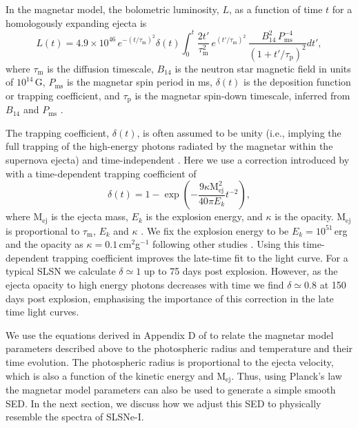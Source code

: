 In the magnetar model, the bolometric luminosity, $L$, as a function
of time $t$ for a homologously expanding ejecta is
\citep{1982ApJ...253..785A}
\begin{equation}
L(t) = 4.9\times 10^{46}\,e^{ -(t / \tau_\mathrm{m})^2 }\delta(t) \int_{0}^{t} \frac{2t'}{\tau_\mathrm{m}^2}\,e^{(t'/\tau_\mathrm{m})^2}\,\frac{B_{14}^{2}\,P_{\mathrm{ms}}^{-4}}{\left(1+t'/\tau_\mathrm{p}\right)^2} dt',
\label{Eq:MagnetarLum}
\end{equation}
where $\tau_\mathrm{m}$ is the diffusion timescale, $B_{14}$ is the
neutron star magnetic field in units of $10^{14}$\,G,
$P_{\mathrm{ms}}$ is the magnetar spin period in ms, $\delta(t)$ is
the deposition function or trapping coefficient, and $\tau_\mathrm{p}$
is the magnetar spin-down timescale, inferred from $B_{14}$ and
$P_{\mathrm{ms}}$ \cite[see Appendix D of ][and references therein for
full details]{2013ApJ...770..128I}.

The trapping coefficient, $\delta(t)$, is often assumed to be unity
(i.e., implying the full trapping of the high-energy photons radiated
by the magnetar within the supernova ejecta) and time-independent
\citep{2013ApJ...770..128I,2015MNRAS.449.1215P,2015MNRAS.452.3869N}.
Here we use a correction introduced by \cite{2015ApJ...799..107W} with
a time-dependent trapping coefficient of
\begin{equation}
\delta(t) = 1 - \exp\left({-\frac{9\kappa \mathrm{M}_{\mathrm{ej}}^{2}}{40\pi  E_k} t^{-2}} \right),
\label{Eq:Wang}
\end{equation}
where $\mathrm{M}_{\mathrm{ej}}$ is the ejecta mass, $E_k$ is the
explosion energy, and $\kappa$ is the opacity.
$\mathrm{M}_{\mathrm{ej}}$ is proportional to $\tau_\mathrm{m}$, $E_k$
and $\kappa$ \citep{2013ApJ...770..128I}. We fix the explosion energy
to be $E_k = 10^{51}$\,erg and the opacity as $\kappa =
0.1$\,cm$^2$g$^{-1}$ following other studies
\citep[e.g.][]{2013ApJ...770..128I,2014ApJ...796...87I,2015MNRAS.452.3869N,2015MNRAS.449.1215P}.
Using this time-dependent trapping coefficient improves the late-time
fit to the light curve.  For a typical SLSN we calculate $\delta
\simeq 1$ up to 75 days post explosion. However, as the ejecta opacity
to high energy photons decreases with time we find $\delta \simeq 0.8$
at 150 days post explosion, emphasising the importance of this
correction in the late time light curves.

We use the equations derived in Appendix D of
\cite{2013ApJ...770..128I} to relate the magnetar model parameters
described above to the photospheric radius and temperature and their
time evolution. The photospheric radius is proportional to the ejecta
velocity, which is also a function of the kinetic energy and
$\mathrm{M}_{\mathrm{ej}}$. Thus, using Planck's law the magnetar
model parameters can also be used to generate a simple smooth SED. In
the next section, we discuss how we adjust this SED to physically
resemble the spectra of SLSNe-I.



